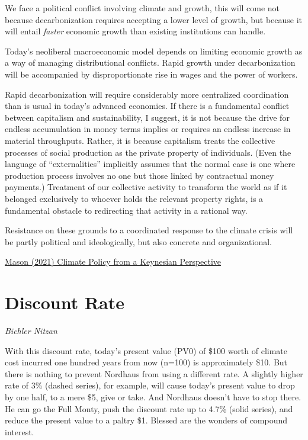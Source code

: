 \documentclass[
]{book}
\begin{document}
We face a political conflict involving climate and growth,
this will come not because decarbonization requires accepting a lower level of growth,
but because it will entail \emph{faster} economic growth
than existing institutions can handle.

Today's neoliberal macroeconomic model depends on limiting economic growth as a way of managing distributional conflicts. Rapid growth under decarbonization will be accompanied by disproportionate rise in wages and the power of workers.

Rapid decarbonization will require considerably more centralized coordination than is usual in today's advanced economies. If there is a fundamental conflict between capitalism and sustainability, I suggest, it is not because the drive for endless accumulation in money terms implies or requires an endless increase in material throughputs. Rather, it is because capitalism treats the collective processes of social production as the private property of individuals. (Even the language of ``externalities'' implicitly assumes that the normal case is one where production process involves no one but those linked by contractual money payments.) Treatment of our collective activity to transform the world as if it belonged exclusively to whoever holds the relevant property rights, is a fundamental obstacle to redirecting that activity in a rational way.

Resistance on these grounds to a coordinated response to the climate crisis will be partly political and ideologically, but also concrete and organizational.

\href{https://jwmason.org/slackwire/climate-policy-from-a-keynesian-perspective/}{Mason (2021) Climate Policy from a Keynesian Perspective}

\hypertarget{discount-rate}{%
\section{Discount Rate}\label{discount-rate}}

\emph{Bichler Nitzan}

With this discount rate, today's present value (PV0) of \$100 worth of climate cost incurred one hundred years from now (n=100) is approximately \$10. But there is nothing to prevent Nordhaus from using a different rate. A slightly higher rate of 3\% (dashed series), for example, will cause today's present value to drop by one half, to a mere \$5, give or take. And Nordhaus doesn't have to stop there. He can go the Full Monty, push the discount rate up to 4.7\% (solid series), and reduce the present value to a paltry \$1. Blessed are the wonders of compound interest.
\end{document}
